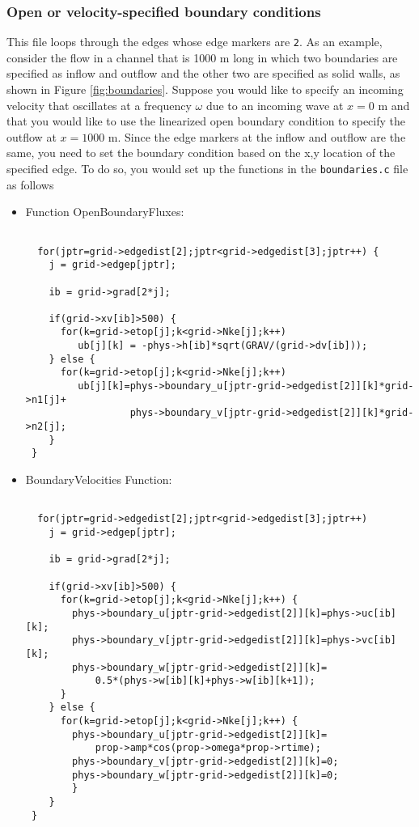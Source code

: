 \subsubsection{Open or velocity-specified boundary conditions}
This file loops through the edges whose edge markers are \verb+2+.  As an example, consider the flow in a 
channel that is 1000 m long in which two boundaries are specified as inflow and outflow and the other two 
are specified as solid walls, as shown in Figure \ref{fig:boundaries}.  
Suppose you would like to
specify an incoming velocity that oscillates at a frequency $\omega$ due to an incoming wave at $x=0$ m and that
you would like to use the linearized open boundary condition to specify the outflow at $x=1000$ m.  Since the
edge markers at the inflow and outflow are the same, you need to set the boundary condition based on the x,y
location of the specified edge.  To do so, you would set up the functions in the \verb+boundaries.c+ file as follows
\begin{itemize}
\item Function OpenBoundaryFluxes:
\begin{verbatim}

  for(jptr=grid->edgedist[2];jptr<grid->edgedist[3];jptr++) {
    j = grid->edgep[jptr];

    ib = grid->grad[2*j];

    if(grid->xv[ib]>500) {
      for(k=grid->etop[j];k<grid->Nke[j];k++) 
         ub[j][k] = -phys->h[ib]*sqrt(GRAV/(grid->dv[ib]));
    } else {
      for(k=grid->etop[j];k<grid->Nke[j];k++) 
         ub[j][k]=phys->boundary_u[jptr-grid->edgedist[2]][k]*grid->n1[j]+
                  phys->boundary_v[jptr-grid->edgedist[2]][k]*grid->n2[j];
    }
 }

\end{verbatim}
\item BoundaryVelocities Function:
\begin{verbatim}

  for(jptr=grid->edgedist[2];jptr<grid->edgedist[3];jptr++) 
    j = grid->edgep[jptr];

    ib = grid->grad[2*j];

    if(grid->xv[ib]>500) {
      for(k=grid->etop[j];k<grid->Nke[j];k++) {
        phys->boundary_u[jptr-grid->edgedist[2]][k]=phys->uc[ib][k];
        phys->boundary_v[jptr-grid->edgedist[2]][k]=phys->vc[ib][k];
        phys->boundary_w[jptr-grid->edgedist[2]][k]=
            0.5*(phys->w[ib][k]+phys->w[ib][k+1]);
      } 
    } else {
      for(k=grid->etop[j];k<grid->Nke[j];k++) {
        phys->boundary_u[jptr-grid->edgedist[2]][k]=
            prop->amp*cos(prop->omega*prop->rtime);
        phys->boundary_v[jptr-grid->edgedist[2]][k]=0;
        phys->boundary_w[jptr-grid->edgedist[2]][k]=0;
        } 
    }
 }

\end{verbatim}
\end{itemize}
